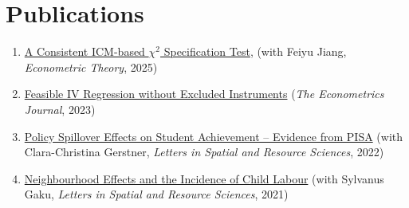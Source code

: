 \documentclass[12pt,letterpaper]{article}
\begin{document}
\section*{Publications}
\begin{enumerate}
  \item \href{https://www.cambridge.org/core/journals/econometric-theory/article/consistent-icmbased-chi2-specification-test/DF98A874F40AA24D1414C62C4F2357C9}{A Consistent ICM-based $\chi^2$ Specification Test}, (with Feiyu Jiang, \textit{Econometric Theory}, 2025) 
  
  \item \href{https://academic.oup.com/ectj/advance-article-abstract/doi/10.1093/ectj/utac032/6888009?redirectedFrom=fulltext}{Feasible IV Regression without Excluded Instruments} (\textit{The Econometrics Journal}, 2023)
  
  \item \href{https://link.springer.com/article/10.1007/s12076-022-00310-y}{Policy Spillover Effects on Student Achievement – Evidence from PISA} (with Clara-Christina Gerstner, \textit{Letters in Spatial and Resource Sciences}, 2022) 
  
	\item \href{https://link.springer.com/article/10.1007/s12076-021-00276-3}{Neighbourhood Effects and the Incidence of Child Labour} (with Sylvanus Gaku, \textit{Letters in Spatial and Resource Sciences}, 2021)
\end{enumerate}
\end{document}
